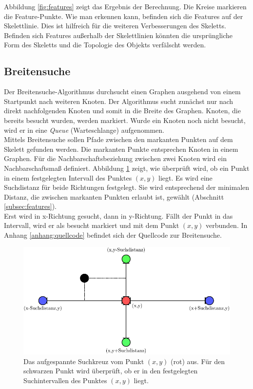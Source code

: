 Abbildung \ref{fig:features} zeigt das Ergebnis der Berechnung. Die Kreise markieren die Feature-Punkte. Wie man erkennen kann, befinden sich die Features auf der Skelettlinie. Dies ist hilfreich für die weiteren
Verbesserungen des Skeletts. Befinden sich Features außerhalb der Skelettlinien könnten die ursprüngliche Form des Skeletts und die Topologie des Objekts verfälscht werden.
\subsection{Breitensuche}
\label{subsec:breitesuche}
Der Breitensuche-Algorithmus durchsucht einen Graphen ausgehend von einem Startpunkt nach weiteren 
Knoten. Der Algorithmus sucht zunächst nur nach direkt nachfolgenden Knoten und somit in die Breite des
Graphen. Knoten, die bereits besucht wurden, werden markiert. Wurde ein Knoten noch nicht besucht, wird er
in eine \emph{Queue} (Warteschlange) aufgenommen.\\
Mittels Breitensuche sollen Pfade zwischen den markanten Punkten auf dem Skelett gefunden werden. Die markanten Punkte entsprechen Knoten in einem Graphen. Für die Nachbarschaftsbeziehung zwischen zwei
Knoten wird ein Nachbarschaftsmaß definiert. Abbildung \ref{fig:suchdistanz_naechster_nachbar} zeigt, wie überprüft wird, ob ein Punkt in einem festgelegten Intervall des Punktes $(x,y)$ liegt. Es wird eine Suchdistanz für beide Richtungen festgelegt. Sie
wird entsprechend der minimalen Distanz, die zwischen markanten Punkten erlaubt ist, gewählt (Abschnitt \ref{subsec:features}). \\
Erst wird in x-Richtung gesucht, dann in y-Richtung. Fällt der Punkt in das Intervall, wird er als besucht markiert und
mit dem Punkt $(x,y)$ verbunden. In Anhang \ref{anhang:quellcode} befindet sich der Quellcode zur Breitensuche.
\begin{figure}[htbp]
\centering
\includegraphics[width=1.0\linewidth]{./fig/suchdistanz_naechster_nachbar}
\caption{Das aufgespannte Suchkreuz vom Punkt $(x,y)$ (rot) aus. Für den schwarzen Punkt wird überprüft, ob er in den festgelegten Suchintervallen des Punktes $(x,y)$ liegt.}
\label{fig:suchdistanz_naechster_nachbar}
\end{figure}\\
